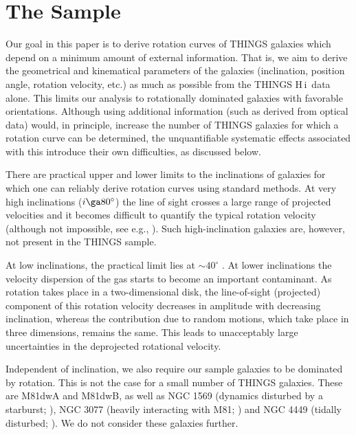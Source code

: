 \documentclass[usenatbib,usegraphicx,apjfonts,floatfix]{emulateapj}
\newcommand{\HI}{H\,{\sc i}}
\begin{document}
\section{The Sample}

Our goal in this paper is to derive rotation curves of THINGS galaxies
which depend on a minimum amount of external information. That is, we
aim to derive the geometrical and kinematical parameters of the
galaxies (inclination, position angle, rotation velocity, etc.) as
much as possible from the THINGS \HI\ data alone.  This limits our
analysis to rotationally dominated galaxies with favorable
orientations. Although using additional information (such as derived
from optical data) would, in principle, increase the number of THINGS
galaxies for which a rotation curve can be determined,
the unquantifiable systematic effects associated with this introduce
their own difficulties, as discussed below.

There are practical upper and lower limits to the inclinations
of galaxies for which one can reliably derive  rotation curves
using standard methods.  At very high inclinations ($i \ga
80^{\circ}$) the line of sight crosses a large range of projected
velocities and it becomes difficult to quantify the typical rotation
velocity (although not impossible, see e.g., \citealt{kregel}). Such
high-inclination galaxies are, however, not present in the THINGS
sample.

At low inclinations, the practical limit lies at $\sim 40^{\circ}$
\citep{begeman87,begeman89}.  At lower inclinations the velocity
dispersion of the gas starts to become an important contaminant. As
rotation takes place in a two-dimensional disk, the line-of-sight
(projected) component of this rotation velocity decreases in amplitude
with decreasing inclination, whereas the contribution due to random
motions, which take place in three dimensions, remains the same. This
leads to unacceptably large uncertainties in the deprojected
rotational velocity.

Independent of inclination, we also require our sample galaxies to be
dominated by rotation. This is not the case for a small number of
THINGS galaxies.  These are M81dwA \citep{sargent} and M81dwB, as well
as NGC 1569 (dynamics disturbed by a starburst; \citealt{stil}), NGC
3077 (heavily interacting with M81; \citealt{walter02}) and NGC 4449
(tidally disturbed; \citealt{hunter4449}). We do not consider these
galaxies further.
\end{document}
